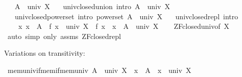 \begin{isabellebody}
\endisatagproof
{\isafoldproof}%
%
\isadelimproof
\isanewline
%
\endisadelimproof
\isanewline
{}\isamarkupfalse%
\isanewline
\ \ \ {\isachardoublequoteopen}A\ {\isasymin}\ univ\ X{\isachardoublequoteclose}\isanewline
\ \ \ univ{\isacharunderscore}{\kern0pt}closed{\isacharunderscore}{\kern0pt}union\ {\isacharbrackleft}{\kern0pt}intro{\isacharbang}{\kern0pt}{\isacharbrackright}{\kern0pt}{\isacharcolon}{\kern0pt}\ {\isachardoublequoteopen}{\isasymUnion}A\ {\isasymin}\ univ\ X{\isachardoublequoteclose}\isanewline
\ \ \ univ{\isacharunderscore}{\kern0pt}closed{\isacharunderscore}{\kern0pt}powerset\ {\isacharbrackleft}{\kern0pt}intro{\isacharbang}{\kern0pt}{\isacharbrackright}{\kern0pt}{\isacharcolon}{\kern0pt}\ {\isachardoublequoteopen}powerset\ A\ {\isasymin}\ univ\ X{\isachardoublequoteclose}\isanewline
\ \ \ univ{\isacharunderscore}{\kern0pt}closed{\isacharunderscore}{\kern0pt}repl\ {\isacharbrackleft}{\kern0pt}intro{\isacharbrackright}{\kern0pt}{\isacharcolon}{\kern0pt}\isanewline
\ \ \ \ {\isachardoublequoteopen}{\isacharparenleft}{\kern0pt}{\isasymAnd}x{\isachardot}{\kern0pt}\ x\ {\isasymin}\ A\ {\isasymLongrightarrow}\ f\ x\ {\isasymin}\ univ\ X{\isacharparenright}{\kern0pt}\ {\isasymLongrightarrow}\ {\isacharbraceleft}{\kern0pt}f\ x\ {\isacharbar}{\kern0pt}\ x\ {\isasymin}\ A{\isacharbraceright}{\kern0pt}\ {\isasymin}\ univ\ X{\isachardoublequoteclose}\isanewline
%
\isadelimproof
\ \ %
\endisadelimproof
%
\isatagproof
{}\isamarkupfalse%
\ ZF{\isacharunderscore}{\kern0pt}closed{\isacharunderscore}{\kern0pt}univ{\isacharbrackleft}{\kern0pt}of\ X{\isacharbrackright}{\kern0pt}\isanewline
\ \ \isamarkupfalse%
\ {\isacharparenleft}{\kern0pt}auto\ simp\ only{\isacharcolon}{\kern0pt}\ assms\ ZF{\isacharunderscore}{\kern0pt}closed{\isacharunderscore}{\kern0pt}repl{\isacharparenright}{\kern0pt}%
\endisatagproof
{\isafoldproof}%
%
\isadelimproof
%
\endisadelimproof
%
\begin{isamarkuptext}%
Variations on transitivity:%
\end{isamarkuptext}\isamarkuptrue%
\isamarkupfalse%
\ mem{\isacharunderscore}{\kern0pt}univ{\isacharunderscore}{\kern0pt}if{\isacharunderscore}{\kern0pt}mem{\isacharunderscore}{\kern0pt}if{\isacharunderscore}{\kern0pt}mem{\isacharunderscore}{\kern0pt}univ{\isacharcolon}{\kern0pt}\ {\isachardoublequoteopen}A\ {\isasymin}\ univ\ X\ {\isasymLongrightarrow}\ x\ {\isasymin}\ A\ {\isasymLongrightarrow}\ x\ {\isasymin}\ univ\ X{\isachardoublequoteclose}\isanewline

\end{isabellebody}
